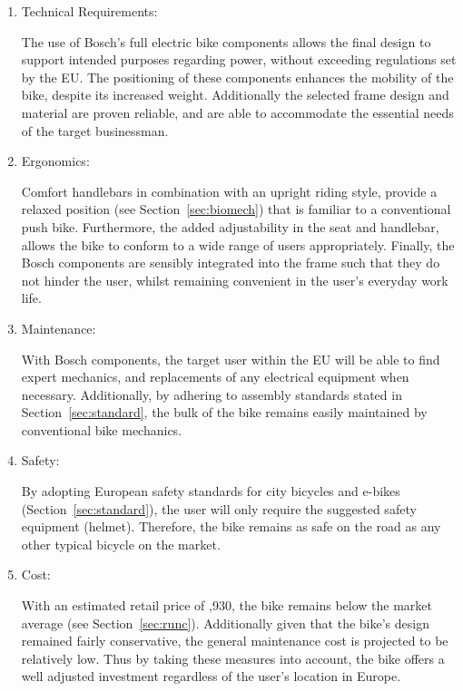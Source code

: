 \documentclass[a4paper,11pt]{article}
\begin{document}
\begin{enumerate}[leftmargin=0pt, itemindent=20pt,labelwidth=15pt, labelsep=5pt, listparindent=0.7cm,align=left]

	\item Technical Requirements:

		The use of Bosch's full electric bike components allows the final design to support intended purposes regarding power, without exceeding regulations set by the EU. The positioning of these components enhances the mobility of the bike, despite its increased weight. Additionally the selected frame design and material are proven reliable, and are able to accommodate the essential needs of the target businessman.
		
	\item Ergonomics:

		Comfort handlebars in combination with an upright riding style, provide a relaxed position (see Section~\ref{sec:biomech}) that is familiar to a conventional push bike. Furthermore, the added adjustability in the seat and handlebar, allows the bike to conform to a wide range of users appropriately. Finally, the Bosch components are sensibly integrated into the frame such that they do not hinder the user, whilst remaining convenient in the user's everyday work life.

	\item Maintenance:

		With Bosch components, the target user within the EU will be able to find expert mechanics, and replacements of any electrical equipment when necessary. Additionally, by adhering to assembly standards stated in Section~\ref{sec:standard}, the bulk of the bike remains easily maintained by conventional bike mechanics.

	\item Safety:

		By adopting European safety standards for city bicycles and e-bikes (Section~\ref{sec:standard}), the user will only require the suggested safety equipment (helmet). Therefore, the bike remains as safe on the road as any other typical bicycle on the market.

	\item Cost:

		With an estimated retail price of ,930, the bike remains below the market average (see Section~\ref{sec:runc}). Additionally given that the bike's design remained fairly conservative, the general maintenance cost is projected to be relatively low. Thus by taking these measures into account, the bike offers a well adjusted investment regardless of the user's location in Europe.

\end{enumerate}
\end{document}
